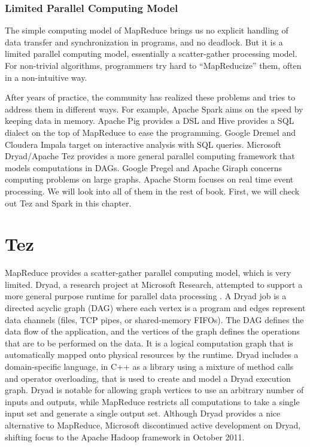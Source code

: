 \documentclass[11pt]{book}
\begin{document}
\subsubsection{Limited Parallel Computing Model}
The simple computing model of MapReduce brings us no explicit handling of data transfer and synchronization in programs, and no deadlock. But it is a limited parallel computing model, essentially a scatter-gather processing model. For non-trivial algorithms, programmers try hard to ``MapReducize'' them, often in a non-intuitive way.

After years of practice, the community has realized these problems and tries to address them in different ways. For example, Apache Spark aims on the speed by keeping data in memory. Apache Pig provides a DSL and Hive provides a SQL dialect on the top of MapReduce to ease the programming. Google Dremel and Cloudera Impala target on interactive analysis with SQL queries. Microsoft Dryad/Apache Tez provides a more general parallel computing framework that models computations in DAGs. Google Pregel and Apache Giraph concerns computing problems on large graphs. Apache Storm focuses on real time event processing. We will look into all of them in the rest of book. First, we will check out Tez and Spark in this chapter.

\section[Tez]
{Tez}
MapReduce provides a scatter-gather parallel computing model, which is very limited. Dryad, a research project at Microsoft Research, attempted to support a more general purpose runtime for parallel data processing \cite{Isard:2007:DDD}. A Dryad job is a directed acyclic graph (DAG) where each vertex is a program and edges represent data channels (files, TCP pipes, or shared-memory FIFOs). The DAG defines the data flow of the application, and the vertices of the graph defines the operations that are to be performed on the data. It is a logical computation graph that is automatically mapped onto physical resources by the runtime. Dryad includes a domain-specific language, in C++ as a library using a mixture of method calls and operator overloading, that is used to create and model a Dryad execution graph. Dryad is notable for allowing graph vertices to use an arbitrary number of inputs and outputs, while MapReduce restricts all computations to take a single input set and generate a single output set. Although Dryad provides a nice alternative to MapReduce, Microsoft discontinued active development on Dryad, shifting focus to the Apache Hadoop framework in October 2011.
\end{document}
